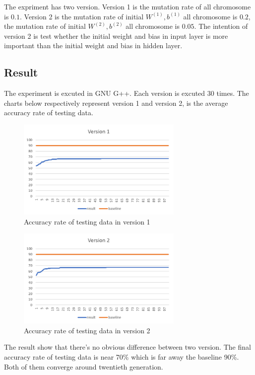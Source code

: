 \documentclass[conference]{IEEEtran}
\begin{document}
The expriment has two version. Version 1 is the mutation rate of all chromosome is $0.1$. Version 2 is the mutation rate of initial $W^{(1)}, b^{(1)}$ all chromosome is $0.2$, the mutation rate of initial $W^{(2)}, b^{(2)}$ all chromosome is $0.05$. The intention of version 2 is test whether the initial weight and bias in input layer is more important than the initial weight and bias in hidden layer.\\

\subsection{Result}
The experiment is excuted in GNU G++. Each version is excuted 30 times. The charts below respectively represent version 1 and version 2, is the average accuracy rate of testing data.\\

\begin{figure}[htbp]
\centerline{\includegraphics[width=8cm]{version1.png}}
\caption{Accuracy rate of testing data in version 1}
\label{fig}
\end{figure}

\begin{figure}[htbp]
\centerline{\includegraphics[width=8cm]{version2.png}}
\caption{Accuracy rate of testing data in version 2}
\label{fig}
\end{figure}

The result show that there's no obvious difference between two version. The final accuracy rate of testing data is near 70\% which is far away the baseline 90\%. Both of them converge around twentieth generation.
\end{document}
